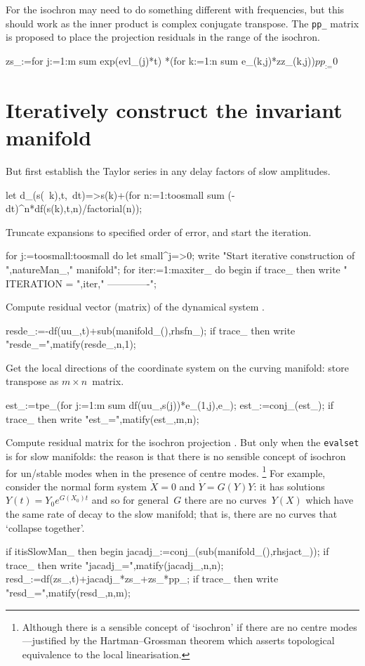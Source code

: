 \documentclass[11pt,a5paper]{article}
\begin{document}
For the isochron may need to do something different with frequencies, but this should work as the inner product is complex conjugate transpose.
The \verb|pp_| matrix is proposed to place the projection residuals in the range of the isochron. 
\begin{reduce}
zs_:=for j:=1:m sum exp(evl_(j)*t)
  *(for k:=1:n sum e_(k,j)*zz_(k,j))$
pp_:=0$
\end{reduce}




\section{Iteratively construct the invariant manifold}

But first establish the Taylor series in any delay factors of slow amplitudes.
\begin{reduce}
let d_(s(~k),t,~dt)=>s(k)+(for n:=1:toosmall sum 
        (-dt)^n*df(s(k),t,n)/factorial(n));
\end{reduce}

Truncate expansions to specified order of error, and start the iteration.
\begin{reduce}
for j:=toosmall:toosmall do let small^j=>0;
write "Start iterative construction of ",natureMan_," manifold";
for iter:=1:maxiter_ do begin
if trace_ then write "
ITERATION = ",iter,"
-------------";
\end{reduce}

Compute residual vector (matrix) of the dynamical system \cite{Roberts96a}.
\begin{reduce}
resde_:=-df(uu_,t)+sub(manifold_(),rhsfn_);
if trace_ then write "resde_=",matify(resde_,n,1);
\end{reduce}

Get the local directions of the coordinate system on the curving manifold: store transpose as \(m\times n\)~matrix.
\begin{reduce}
est_:=tpe_(for j:=1:m sum df(uu_,s(j))*e_(1,j),e_);
est_:=conj_(est_);
if trace_ then write "est_=",matify(est_,m,n);
\end{reduce}

Compute residual matrix for the isochron projection \cite{Roberts89b, Roberts97b}. 
But only when the \verb|evalset| is for slow manifolds: the reason is that there is no sensible concept of isochron for un/stable modes when in the presence of centre modes.
\footnote{Although there is a sensible concept of `isochron' if there are no centre modes---justified by the Hartman--Grossman theorem which asserts topological equivalence to the local linearisation.}
For example, consider the normal form system \(\dot X=0\) and \(\dot Y=G(Y)Y\): it has solutions \(Y(t)=Y_0e^{G(X_0)t}\) and so for general~\(G\) there are no curves~\(Y(X)\) which have the same rate of decay to the slow manifold; that is, there are no curves that `collapse together'.
\begin{reduce}
if itisSlowMan_ then begin
    jacadj_:=conj_(sub(manifold_(),rhsjact_));
if trace_ then write "jacadj_=",matify(jacadj_,n,n);
    resd_:=df(zs_,t)+jacadj_*zs_+zs_*pp_;
if trace_ then write "resd_=",matify(resd_,n,m);
\end{reduce}
\end{document}
